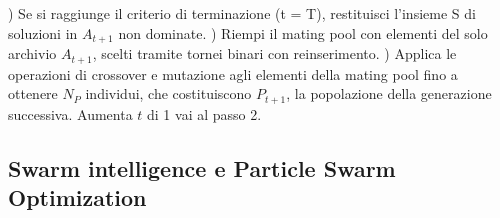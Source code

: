 \documentclass[12pt]{article}
\begin{document}
\tab {}) Se si raggiunge il criterio di terminazione (t = T), restituisci l'insieme S di soluzioni in $A_{t+1}$ non dominate.\newline
\tab {}) Riempi il mating pool con elementi del solo archivio $A_{t+1}$, scelti tramite tornei binari con reinserimento. \newline
\tab {}) Applica le operazioni di crossover e mutazione agli elementi della mating pool fino a ottenere $N_P$ individui, che costituiscono $P_{t+1}$, la popolazione della generazione successiva. Aumenta $t$ di 1 vai al passo 2. \newline

\subsection*{Swarm intelligence e Particle Swarm Optimization}
\end{document}
